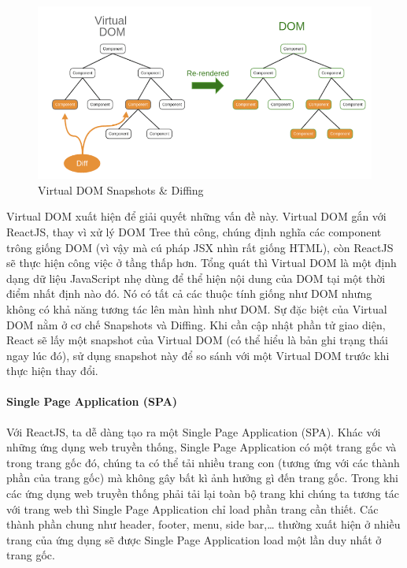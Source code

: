 \begin{figure}[H]
\centering
\includegraphics[width=\textwidth]{images/DOM.png}
\caption{Virtual DOM Snapshots \& Diffing}
\label{fig:virtualdom}
\end{figure}

Virtual DOM xuất hiện để giải quyết những vấn đề này.
Virtual DOM gắn với ReactJS, thay vì xử lý DOM Tree thủ công,
chúng định nghĩa các component trông giống DOM
(vì vậy mà cú pháp JSX nhìn rất giống HTML), còn ReactJS sẽ thực
hiện công việc ở tầng thấp hơn. Tổng quát thì Virtual DOM là
một định dạng dữ liệu JavaScript nhẹ dùng để thể hiện nội dung
của DOM tại một thời điểm nhất định nào đó. Nó có tất cả các thuộc
tính giống như DOM nhưng không có khả năng tương tác lên màn hình như
DOM. Sự đặc biệt của Virtual DOM nằm ở cơ chế Snapshots và Diffing.
Khi cần cập nhật phần tử giao diện, React sẽ lấy một snapshot của Virtual
DOM (có thể hiểu là bản ghi trạng thái ngay lúc đó),
sử dụng snapshot này để so sánh với một Virtual DOM trước
khi thực hiện thay đổi.
\paragraph{Single Page Application (SPA)}
Với ReactJS, ta dễ dàng tạo ra một Single Page Application (SPA).
Khác với những ứng dụng web truyền thống, Single Page Application
có một trang gốc và trong trang gốc đó, chúng ta có thể tải
nhiều trang con (tương ứng với các thành phần của trang gốc) mà
không gây bất kì ảnh hưởng gì đến trang gốc. Trong khi các
ứng dụng web truyền thống phải tải lại toàn bộ trang khi
chúng ta tương tác với trang web thì Single Page Application chỉ load
phần trang cần thiết. Các thành phần chung như header, footer, menu,
side bar,… thường xuất hiện ở nhiều trang của ứng dụng sẽ được
Single Page Application load một lần duy nhất ở trang gốc.

